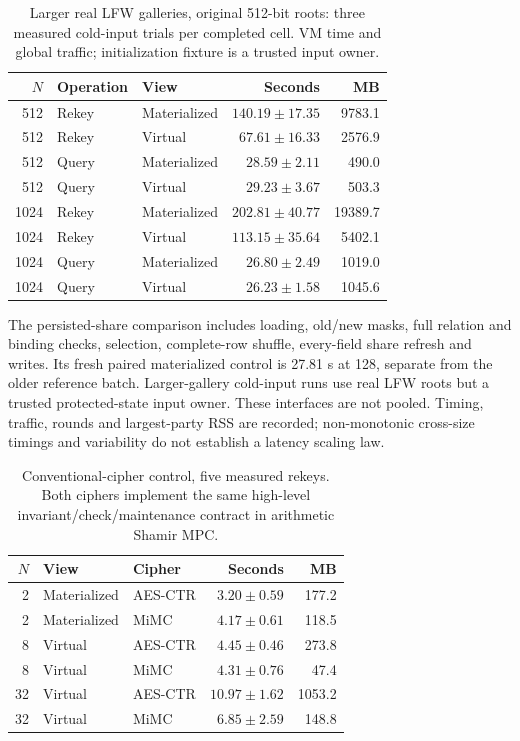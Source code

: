 \begin{table}[t]
\caption{Larger real LFW galleries, original 512-bit roots: three measured cold-input trials per completed cell. VM time and global traffic; initialization fixture is a trusted input owner.}
\label{tab:v3scale}\centering\small
\setlength{\tabcolsep}{3pt}
\begin{tabular}{rllrr}
\toprule
$N$ & Operation & View & Seconds & MB \\
\midrule
512 & Rekey & Materialized & $140.19\pm17.35$ & 9783.1 \\
512 & Rekey & Virtual & $67.61\pm16.33$ & 2576.9 \\
512 & Query & Materialized & $28.59\pm2.11$ & 490.0 \\
512 & Query & Virtual & $29.23\pm3.67$ & 503.3 \\
1024 & Rekey & Materialized & $202.81\pm40.77$ & 19389.7 \\
1024 & Rekey & Virtual & $113.15\pm35.64$ & 5402.1 \\
1024 & Query & Materialized & $26.80\pm2.49$ & 1019.0 \\
1024 & Query & Virtual & $26.23\pm1.58$ & 1045.6 \\
\bottomrule
\end{tabular}
\end{table}

The persisted-share comparison includes loading, old/new masks, full relation and binding checks, selection, complete-row shuffle, every-field share refresh and writes. Its fresh paired materialized control is 27.81 s at 128, separate from the older reference batch. Larger-gallery cold-input runs use real LFW roots but a trusted protected-state input owner. These interfaces are not pooled. Timing, traffic, rounds and largest-party RSS are recorded; non-monotonic cross-size timings and variability do not establish a latency scaling law.

\begin{table}[t]
\caption{Conventional-cipher control, five measured rekeys. Both ciphers implement the same high-level invariant/check/maintenance contract in arithmetic Shamir MPC.}
\label{tab:v3cipher}\centering\small
\setlength{\tabcolsep}{3pt}
\begin{tabular}{rllrr}
\toprule
$N$ & View & Cipher & Seconds & MB \\
\midrule
2 & Materialized & AES-CTR & $3.20\pm0.59$ & 177.2 \\
2 & Materialized & MiMC & $4.17\pm0.61$ & 118.5 \\
8 & Virtual & AES-CTR & $4.45\pm0.46$ & 273.8 \\
8 & Virtual & MiMC & $4.31\pm0.76$ & 47.4 \\
32 & Virtual & AES-CTR & $10.97\pm1.62$ & 1053.2 \\
32 & Virtual & MiMC & $6.85\pm2.59$ & 148.8 \\
\bottomrule
\end{tabular}
\end{table}

